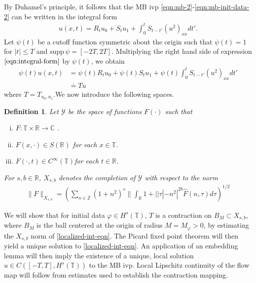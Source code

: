 \documentclass[12pt,reqno]{amsart}
\numberwithin{equation}{section}  %
\numberwithin{figure}{section}
\newcommand{\rr}{\mathbb{R}}
\newcommand{\zz}{\mathbb{Z}}
\newcommand{\cc}{\mathbb{C}}
\newcommand{\ci}{\mathbb{T}}
\newcommand{\wh}{\widehat}
\newcommand{\vp}{\varphi}
\newtheorem{definition}[theorem]{Definition}
\begin{document}
%
By Duhamel's principle, it
follows that the MB ivp \eqref{eqn:mb-2}-\eqref{eqn:mb-init-data-2} can
be written in the integral form
%
%
\begin{equation}
  \begin{split}
    u(x,t) = R_{t}u_{0} + S_{t}u_{1} + \int_{0}^{t} S_{t-t'}
    (u^{2})_{xx} dt'.
  \end{split}
  \label{eqn:integral-form}
\end{equation}
%
%
Let $\psi(t)$ be a cutoff function symmetric about the 
origin such that $\psi(t) = 1$ for $|t| \le T$ and $\text{supp} \, \psi 
= [-2T, 2T ]$. Multiplying the right hand side of expression
$\eqref{eqn:integral-form}$ by $\psi(t)$, we obtain
%
%
\begin{equation}
  \begin{split}
    \psi(t) u(x,t)
    & = \psi(t) R_{t} u_{0} + \psi(t) S_{t}u_{1} +
    \psi(t) \int_{0}^{t} S_{t-t'}
    (u^{2})_{xx} dt'
    \\
    & \doteq Tu
  \end{split}
  \label{localized-int-eqn}
\end{equation}
where $T=T_{u_0, u_1}$.We now introduce the following spaces. 
%
%
\begin{definition}
  Let $\mathcal{Y}$ be the space of functions $F(\cdot)$ such that
  \begin{enumerate}[(i)]
   \item{$F: \ci \times \rr \to \cc$ }.
   \item{ $F(x, \cdot) \in S(\rr)$ for each $x \in \ci$}.
   \item{ $F(\cdot, t) \in C^{\infty}(\ci)$for each $t \in \rr$}.
  \end{enumerate}
  For $s, b \in \rr$, $X_{s,b}$ denotes the completion of $\mathcal{Y}$ with
  respect to the norm
  \begin{equation}
  \begin{split}
    \|F\|_{X_{s,b}} = \left( \sum_{n \in \zz} (1 + n^{2})^{s}\| \int_{\rr}
    1 + | | \tau | - n^{2} |^{2b} \wh{F}(n, \tau) d \tau\right)^{1/2}
  \end{split}
  \label{eqn:bous-norm}
  \end{equation}
\end{definition}
%
%
We will 
show that for initial data $\vp \in {H}^s(\ci)$, $T$ is a contraction on $B_M 
\subset {X}_{s,b}$, where $B_M$ is the ball centered at the origin of radius $M = 
M_{\vp}> 0$, by estimating the $X_{s,b}$
norm of \eqref{localized-int-eqn}. The Picard fixed point theorem will
then yield a unique solution to
\eqref{localized-int-eqn}. An application of an embedding lemma
will then imply the existence of a unique, local
solution $u \in C([-T, T], H^s(\ci))$ to the MB ivp. Local Lipschitz continuity of the flow map will follow from estimates used to establish the contraction mapping. %
%
%
%
%
%
%
%
%
%
%
\end{document}
